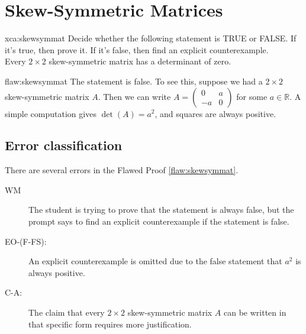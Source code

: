 \section{Skew-Symmetric Matrices}

\begin{xca}{xca:skewsymmat}
Decide whether the following statement is TRUE or FALSE. If it's true, then prove it. If it's false, then  find an explicit counterexample. \\

Every $2\times 2$ skew-symmetric matrix has a determinant of zero.
\end{xca}

\begin{flaw}{flaw:skewsymmat} %
The statement is false. To see this, suppose we had a $2\times 2$ skew-symmetric matrix $A$. Then we can write $A = \begin{pmatrix}0 & a \\ -a & 0 \end{pmatrix}$ for some $a \in \mathbb{R}$. A simple computation gives $\det(A) = a^2$, and squares are always positive.
\end{flaw}

\clearpage
\subsection{Error classification}


There are several errors
 in the Flawed Proof \ref{flaw:skewsymmat}. %


 \begin{description}
 \item[WM] The student is trying to prove that the statement is always false, but the prompt says to find an explicit counterexample if the statement is false.
 \item[EO-(F-FS):] An explicit counterexample is omitted due to the false statement that $a^2$ is always positive.

 	\item[C-A:] The claim that every $2\times 2$ skew-symmetric matrix $A$ can be written in that specific form requires more justification.
 \end{description}


